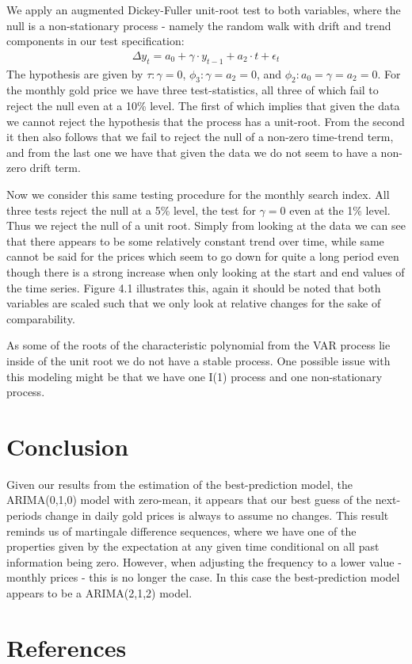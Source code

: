 \documentclass[a4paper]{article}
\theoremstyle{definition}
\begin{document}
We apply an augmented Dickey-Fuller unit-root test to both variables, where the null is a non-stationary process - namely the random walk with drift and trend components in our test specification:
	\begin{align*}
	 \Delta y_t = a_0 + \gamma \cdot y_{t-1} + a_2 \cdot t + \epsilon_{t}
	\end{align*}
The hypothesis are given by $\tau: \gamma = 0$, $\phi_3: \gamma = a_2 = 0$, and $\phi_2: a_0 = \gamma = a_2 = 0$. For the monthly gold price we have three test-statistics, all three of which fail to reject the null even at a 10\% level. The first of which implies that given the data we cannot reject the hypothesis that the process has a unit-root. From the second it then also follows that we fail to reject the null of a non-zero time-trend term, and from the last one we have that given the data we do not seem to have a non-zero drift term.

Now we consider this same testing procedure for the monthly search index. All three tests reject the null at a 5\% level, the test for $\gamma = 0$ even at the 1\% level. Thus we reject the null of a unit root. Simply from looking at the data we can see that there appears to be some relatively constant trend over time, while same cannot be said for the prices which seem to go down for quite a long period even though there is a strong increase when only looking at the start and end values of the time series. Figure 4.1 illustrates this, again it should be noted that both variables are scaled such that we only look at relative changes for the sake of comparability.



As some of the roots of the characteristic polynomial from the VAR process lie inside of the unit root we do not have a stable process. One possible issue with this modeling might be that we have one I(1) process and one non-stationary process. 

\newpage
\section{Conclusion}
Given our results from the estimation of the best-prediction model, the ARIMA(0,1,0) model with zero-mean, it appears that our best guess of the next-periods change in daily gold prices is always to assume no changes. This result reminds us of martingale difference sequences, where we have one of the properties given by the expectation at any given time conditional on all past information being zero. However, when adjusting the frequency to a lower value - monthly prices - this is no longer the case. In this case the best-prediction model appears to be a ARIMA(2,1,2) model. 
%
%
%
%
%
%
%
%
\newpage
{}
\section*{References}
\printbibliography
\end{document}
